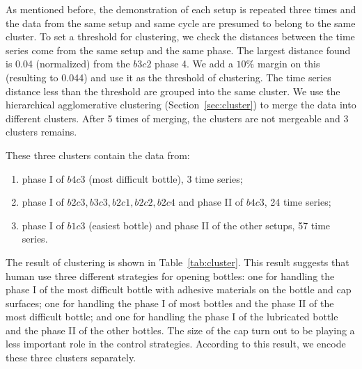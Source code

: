 As mentioned before, the demonstration of each setup is repeated three times and the data from the same setup and same cycle are presumed to belong to the same cluster. To set a threshold for clustering, we check the distances between the time series come from the same setup and the same phase. The largest distance found is 0.04 (normalized) from the $b3c2$ phase 4. We add a $10\%$ margin on this (resulting to 0.044) and use it as the threshold of clustering. The time series distance less than the threshold are grouped into the same cluster. We use the hierarchical agglomerative clustering (Section~\ref{sec:cluster}) to merge the data into different clusters. After 5 times of merging, the clusters are not mergeable and 3 clusters remains.

These three clusters contain the data from:

\begin{enumerate}
\item phase I of $b4c3$ (most difficult bottle), 3 time series;
\item phase I of $b2c3, b3c3, b2c1, b2c2, b2c4$ and phase II of $b4c3$, 24 time series;
\item phase I of $b1c3$ (easiest bottle) and phase II of the other setups, 57 time series.
\end{enumerate}

The result of clustering is shown in Table~\ref{tab:cluster}. This result suggests that human use three different strategies for opening bottles: one for handling the phase I of the most difficult bottle with adhesive materials on the bottle and cap surfaces; one for handling the phase I of most bottles and the phase II of the most difficult bottle; and one for handling the phase I of the lubricated bottle and the phase II of the other bottles. The size of the cap turn out to be playing a less important role in the control strategies. According to this result, we encode these three clusters separately.


